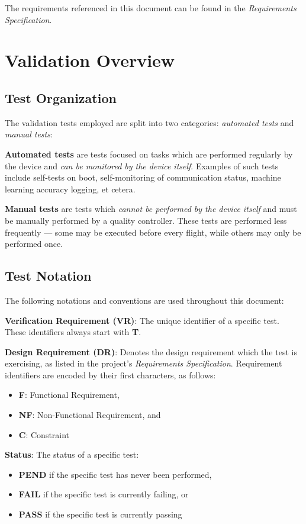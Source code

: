 \documentclass[10pt,letterpaper]{article}
\begin{document}
The requirements referenced in this document can be found in the \textit{Requirements Specification}.

\section{Validation Overview}

\subsection{Test Organization}\label{auto}
The validation tests employed are split into two categories: \textit{automated tests} and \textit{manual tests}:

\textbf{Automated tests} are tests focused on tasks which are performed regularly by the device and \textit{can be monitored by the device itself}. Examples of such tests include self-tests on boot, self-monitoring of communication status, machine learning accuracy logging, et cetera.

\textbf{Manual tests} are tests which \textit{cannot be performed by the device itself} and must be manually performed by a quality controller. These tests are performed less frequently --- some may be executed before every flight, while others may only be performed once. 

\subsection{Test Notation}
The following notations and conventions are used throughout this document:

\textbf{Verification Requirement (VR)}: The unique identifier of a specific test. These identifiers always start with \textbf{T}.

\textbf{Design Requirement (DR)}: Denotes the design requirement which the test is exercising, as listed in the project's \textit{Requirements Specification}. Requirement identifiers are encoded by their first characters, as follows:
\begin{itemize}
	\item \textbf{F}: Functional Requirement,
	\item \textbf{NF}: Non-Functional Requirement, and
	\item \textbf{C}: Constraint
\end{itemize}

\textbf{Status}: The status of a specific test:
\begin{itemize}
	\item \textbf{PEND} if the specific test has never been performed,
	\item \textbf{FAIL} if the specific test is currently failing, or
	\item \textbf{PASS} if the specific test is currently passing
\end{itemize}
\end{document}
